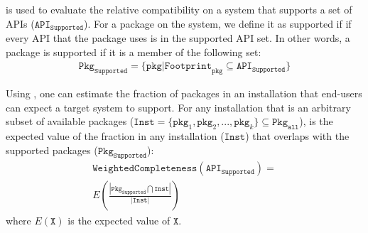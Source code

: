 

\begin{comment}
We defined {\bf platform compatibility} as "{\em the probability of porting any installation of an OS distribution onto the target OS without any effort}".
The definition of an {\em installation} is a combination of application setup on a standalone OS instance.
An Installation can exist on physical machines,
or any machines of generalized sense such as a virtual machines, containers or subsystems.
In our model, installations represent customers of the OS, who are considered equal when providing any services.
\end{comment}

\vspace{0.1in}
{\noindent
{}}
\vspace{0.1in}

\Compatmetric{} is used to evaluate the relative compatibility on a system that
supports a set of APIs ($\mathtt{API}_\mathtt{Supported}$).
For a package on the system, we define it as supported if 
if every API that the package uses is in the supported API set.
In other words, a package is supported if it is a member of the following set:
\begin{align*}
\mathtt{Pkg}_\mathtt{Supported} = \{\mathtt{pkg} | \mathtt{Footprint}_\mathtt{pkg} \subseteq \mathtt{API}_\mathtt{Supported}\}
\end{align*}

\noindent
Using \compatmetric{}, one can estimate the fraction of packages in an installation that end-users can expect a target system to support.
For any installation
that is an arbitrary subset of available packages
($\mathtt{Inst} = \{\mathtt{pkg}_1, \mathtt{pkg}_2, ..., \mathtt{pkg}_k\} \subseteq \mathtt{Pkg}_\mathtt{all}$),
\compatmetric{} is the expected value of
the fraction in any installation ($\mathtt{Inst}$)
that overlaps with the supported packages ($\mathtt{Pkg}_\mathtt{Supported}$):
\begin{align*}
\mathtt{Weighted Completeness}(\mathtt{API}_\mathtt{Supported}) =\\
E(\frac{|\mathtt{Pkg}_\mathtt{Supported} \bigcap \mathtt{Inst}|}{|\mathtt{Inst}|}) 
\end{align*}
where $E(\mathtt{X})$ is the expected value of $\mathtt{X}$.

